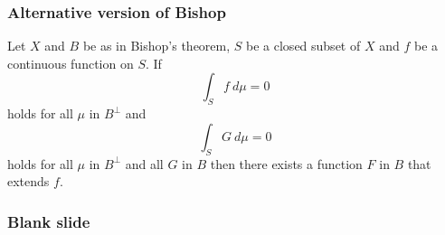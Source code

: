 \documentclass{beamer}
\begin{document}
\begin{frame}
	\frametitle{Alternative version of Bishop}
\small
\begin{theorem}
Let $X$ and $B$ be as in Bishop's theorem, $S$ be a closed subset of $X$ and $f$ be a continuous function on $S$.
If
\[
	\int_S f\ d\mu = 0
\]
holds for all $\mu$ in $B^{\bot}$ and
\[
	\int_S G\ d\mu = 0
\]
holds for all $\mu$ in $B^{\bot}$ and all $G$ in $B$ then there exists a function $F$ in $B$ that extends $f$.
\end{theorem}
\end{frame}

\begin{frame}
	\frametitle{Blank slide}
\end{frame}
\end{document}
